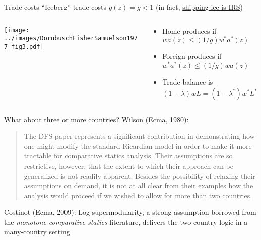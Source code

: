 \documentclass[10pt,notes=hide]{beamer}
\begin{document}
\begin{frame}{Trade costs}
``Iceberg'' trade costs $g(z) = g < 1$ (in fact, \href{https://ideas.repec.org/p/ces/ceswps/_6881.html}{shipping ice is IRS})
\begin{columns}
\begin{column}{.53\textwidth}
\begin{center}\texttt{[image: ../images/DornbuschFisherSamuelson1977\_fig3.pdf]}\end{center}
\end{column}
\begin{column}{.45\textwidth}
\begin{itemize}
	\item Home produces if $w a(z) \leq (1/g) w^{*} a^{*}(z)$
	\item Foreign produces if $w^{*} a^{*}(z) \leq (1/g) w a(z)$
	\item Trade balance is $(1-\lambda)w L  = (1-\lambda^{*}) w^{*}L^{*}$
\end{itemize}
\end{column}
\end{columns}
\end{frame}
\begin{frame}{What about three or more countries?}
Wilson (Ecma, 1980):
\begin{quote}
{\small The DFS paper represents a significant contribution in demonstrating how one might modify the standard Ricardian model in order to make it more tractable for comparative statics analysis.
Their assumptions are so restrictive, however, that the extent to which their approach can be generalized is not readily apparent.
Besides the possibility of relaxing their assumptions on demand, it is not at all clear from their examples how the analysis would proceed if we wished to allow for more than two countries.\par}
\end{quote}
Costinot (Ecma, 2009): 
Log-supermodularity,
a strong assumption borrowed from the \textit{monotone comparative statics} literature,
delivers the two-country logic in a many-country setting
\end{frame}
\end{document}
